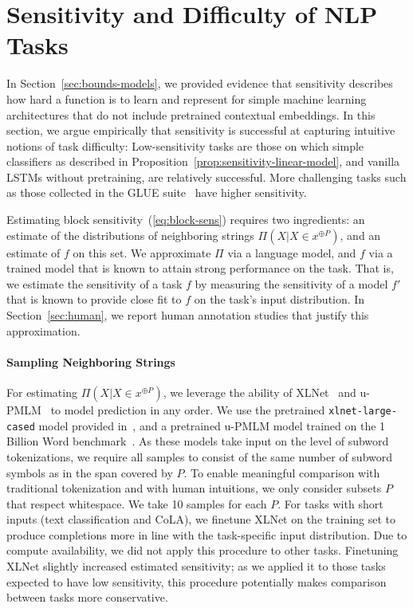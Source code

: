 \documentclass[11pt,a4paper]{article}
\begin{document}
\section{Sensitivity and Difficulty of NLP Tasks}\label{sec:measuring}

In Section~\ref{sec:bounds-models}, we provided evidence that sensitivity describes how hard a function is to learn and represent for simple machine learning architectures that do not include pretrained contextual embeddings.
In this section, we argue empirically that sensitivity is successful at capturing intuitive notions of task difficulty: Low-sensitivity tasks are those on which simple classifiers as described in Proposition~\ref{prop:sensitivity-linear-model}, and vanilla LSTMs without pretraining, are relatively successful.
More challenging tasks such as those collected in the GLUE suite~\citep{wang2019glue} have higher sensitivity.



Estimating block sensitivity~(\ref{eq:block-sens}) requires two ingredients:
an estimate of the distributions of neighboring strings $\Pi(X|X \in x^{\oplus P})$, and an estimate of $f$ on this set.
We approximate $\Pi$ via a language model, and $f$ via a trained model that is known to attain strong performance on the task. 
That is, we estimate the sensitivity of a task $f$ by measuring the sensitivity of a model $f'$ that is known to provide close fit to $f$ on the task's input distribution.
In Section~\ref{sec:human}, we report human annotation studies that justify this approximation.





\paragraph{Sampling Neighboring Strings}
For estimating $\Pi(X|X \in x^{\oplus P})$, we leverage the ability of XLNet~\citep{yang2019xlnet} and u-PMLM~\citep{liao2020probabilistically} to model prediction in any order.
We use the pretrained \texttt{xlnet-large-cased} model provided in~\citet{wolf2019huggingface}, and a pretrained u-PMLM model trained on the 1 Billion Word benchmark~\citep{chelba2014one}.
As these models take input on the level of subword tokenizations, we require all samples to consist of the same number of subword symbols as in the span covered by $P$.
To enable meaningful comparison with traditional tokenization and with human intuitions, we only consider subsets $P$ that respect whitespace.
We take 10 samples for each $P$.
For tasks with short inputs (text classification and CoLA), we finetune XLNet on the training set to produce completions more in line with the task-specific input distribution.
Due to compute availability, we did not apply this procedure to other tasks.
Finetuning XLNet slightly increased estimated sensitivity; as we applied it to those tasks expected to have low sensitivity, this procedure potentially makes comparison between tasks more conservative.
\end{document}
